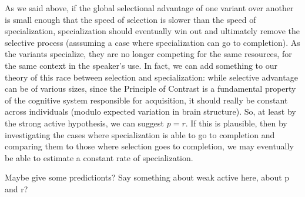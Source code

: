 


As we said above, if the global selectional advantage of one variant over another is small enough that the speed of selection is slower than the speed of specialization, specialization should eventually win out and ultimately remove the selective process (asssuming a case where specialization can go to completion).
As the variants specialize, they are no longer competing for the same resources, for the same context in the speaker's use.
In fact, we can add something to our theory of this race between selection and specialization: while selective advantage can be of various sizes, since the Principle of Contrast is a fundamental property of the cognitive system responsible for acquisition, it should really be constant across individuals (modulo expected variation in brain structure).
So, at least by the strong active hypothesis, we can suggest $p = r$.
If this is plausible, then by investigating the cases where specialization is able to go to completion and comparing them to those where selection goes to completion, we may eventually be able to estimate a constant rate of specialization.

Maybe give some predictionts?
Say something about weak active here, about p and r?

